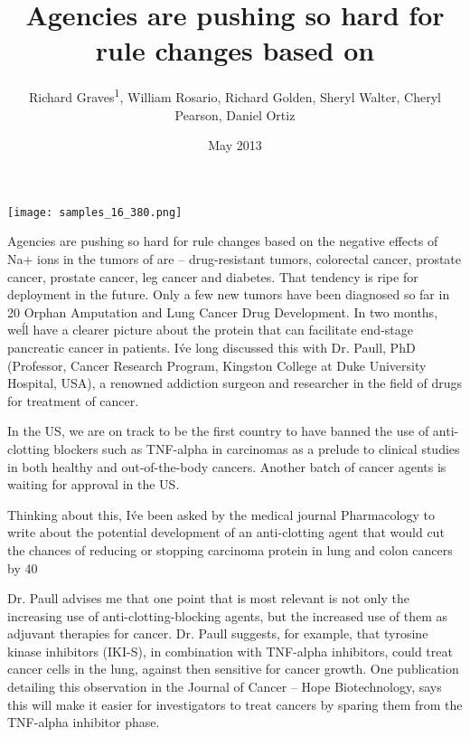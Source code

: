 \documentclass{article}
\title{Agencies are pushing so hard for rule changes based on}
\author{Richard Graves\textsuperscript{1},  William Rosario,  Richard Golden,  Sheryl Walter,  Cheryl Pearson,  Daniel Ortiz}
\affil{\textsuperscript{1}Columbia University}
\date{May 2013}
\begin{document}
\maketitle

\begin{center}
\begin{minipage}{0.75\linewidth}
\texttt{[image: samples\_16\_380.png]}
\end{minipage}
\end{center}

Agencies are pushing so hard for rule changes based on the negative effects of Na+ ions in the tumors of are -- drug-resistant tumors, colorectal cancer, prostate cancer, prostate cancer, leg cancer and diabetes. That tendency is ripe for deployment in the future. Only a few new tumors have been diagnosed so far in 20 Orphan Amputation and Lung Cancer Drug Development. In two months, we\'ll have a clearer picture about the protein that can facilitate end-stage pancreatic cancer in patients. I\'ve long discussed this with Dr. Paull, PhD (Professor, Cancer Research Program, Kingston College at Duke University Hospital, USA), a renowned addiction surgeon and researcher in the field of drugs for treatment of cancer.

In the US, we are on track to be the first country to have banned the use of anti-clotting blockers such as TNF-alpha in carcinomas as a prelude to clinical studies in both healthy and out-of-the-body cancers. Another batch of cancer agents is waiting for approval in the US.

Thinking about this, I\'ve been asked by the medical journal Pharmacology to write about the potential development of an anti-clotting agent that would cut the chances of reducing or stopping carcinoma protein in lung and colon cancers by 40%

Dr. Paull advises me that one point that is most relevant is not only the increasing use of anti-clotting-blocking agents, but the increased use of them as adjuvant therapies for cancer. Dr. Paull suggests, for example, that tyrosine kinase inhibitors (IKI-S), in combination with TNF-alpha inhibitors, could treat cancer cells in the lung, against then sensitive for cancer growth. One publication detailing this observation in the Journal of Cancer -- Hope Biotechnology, says this will make it easier for investigators to treat cancers by sparing them from the TNF-alpha inhibitor phase.
\end{document}
